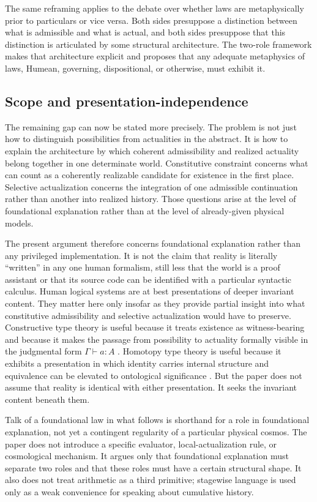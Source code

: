 \documentclass[11pt]{article}
\theoremstyle{foundation}
\begin{document}
The same reframing applies to the debate over whether laws are metaphysically prior to particulars or vice versa. Both sides presuppose a distinction between what is admissible and what is actual, and both sides presuppose that this distinction is articulated by some structural architecture. The two-role framework makes that architecture explicit and proposes that any adequate metaphysics of laws, Humean, governing, dispositional, or otherwise, must exhibit it.

\subsection{Scope and presentation-independence}

The remaining gap can now be stated more precisely. The problem is not just how to distinguish possibilities from actualities in the abstract. It is how to explain the architecture by which coherent admissibility and realized actuality belong together in one determinate world. Constitutive constraint concerns what can count as a coherently realizable candidate for existence in the first place. Selective actualization concerns the integration of one admissible continuation rather than another into realized history. Those questions arise at the level of foundational explanation rather than at the level of already-given physical models.

The present argument therefore concerns foundational explanation rather than any privileged implementation. It is not the claim that reality is literally ``written'' in any one human formalism, still less that the world is a proof assistant or that its source code can be identified with a particular syntactic calculus. Human logical systems are at best presentations of deeper invariant content. They matter here only insofar as they provide partial insight into what constitutive admissibility and selective actualization would have to preserve. Constructive type theory is useful because it treats existence as witness-bearing and because it makes the passage from possibility to actuality formally visible in the judgmental form $\Gamma \vdash a : A$ \citep{MartinLof1984}. Homotopy type theory is useful because it exhibits a presentation in which identity carries internal structure and equivalence can be elevated to ontological significance \citep{UF2013}. But the paper does not assume that reality is identical with either presentation. It seeks the invariant content beneath them.

Talk of a foundational law in what follows is shorthand for a role in foundational explanation, not yet a contingent regularity of a particular physical cosmos. The paper does not introduce a specific evaluator, local-actualization rule, or cosmological mechanism. It argues only that foundational explanation must separate two roles and that these roles must have a certain structural shape. It also does not treat arithmetic as a third primitive; stagewise language is used only as a weak convenience for speaking about cumulative history.
\end{document}
